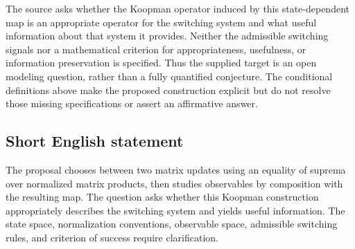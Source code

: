 \documentclass[11pt]{article}
\begin{document}
The source asks whether the Koopman operator induced by this state-dependent map is an appropriate operator for the switching system and what useful information about that system it provides. Neither the admissible switching signals nor a mathematical criterion for appropriateness, usefulness, or information preservation is specified. Thus the supplied target is an open modeling question, rather than a fully quantified conjecture. The conditional definitions above make the proposed construction explicit but do not resolve those missing specifications or assert an affirmative answer.
\subsection{Short English statement}
The proposal chooses between two matrix updates using an equality of suprema over normalized matrix products, then studies observables by composition with the resulting map. The question asks whether this Koopman construction appropriately describes the switching system and yields useful information. The state space, normalization conventions, observable space, admissible switching rules, and criterion of success require clarification.
\end{document}
